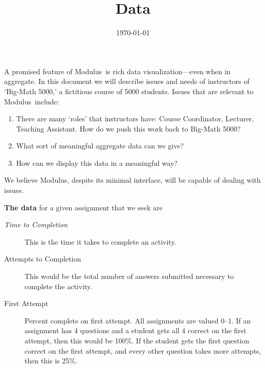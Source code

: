 \documentclass{techbrief}
\title{Data}
\date{\today}
\newcommand{\modulus}{\textsf{Modulus}}
\begin{document}
\pagestyle{main}%
\thispagestyle{title}
\lettrine[lines=2]{A}{} promised feature of \modulus\ is rich data visualization---even when in
aggregate.
In this document we will describe issues and needs of instructors of `Big-Math
5000,' a fictitious course of 5000 students.
Issues that are relevant to \modulus\ include:
\begin{enumerate}
    \item There are many `roles' that instructors have: Course Coordinator,
          Lecturer, Teaching Assistant. How do we push this work back to
          Big-Math 5000?
    \item What sort of meaningful aggregate data can we give?
    \item How can we display this data in a meaningful way?
\end{enumerate}

We believe \modulus, despite its minimal interface, will be capable of dealing with issues.

\begin{xframe}
    \textbf{The data} for a given assignment that we seek are 
    \begin{description}
        \item[\textit{Time to Completion}] This is the time it takes to complete an
            activity.
        \item[Attempts to Completion] This would be the total number of answers
            submitted necessary to complete the activity.
        \item[First Attempt] Percent complete on first
            attempt. All assignments are valued
            0--1. If an assignment has 4 questions and a student gets
            all 4 correct on the first attempt, then this would be 100\%. If
            the student gets the first question correct on the first attempt, and every other
            question takes more attempts, then this is 25\%.
    \end{description}
\end{xframe}
\end{document}
